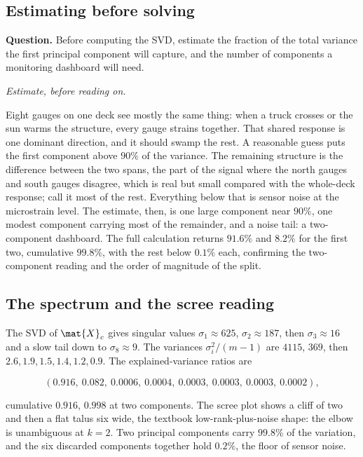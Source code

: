 \subsection{Estimating before solving}

\begin{estimation}
\textbf{Question.} Before computing the SVD, estimate the fraction of
the total variance the first principal component will capture, and the
number of components a monitoring dashboard will need.

\smallskip
\textit{Estimate, before reading on.}

\smallskip
Eight gauges on one deck see mostly the same thing: when a truck crosses
or the sun warms the structure, every gauge strains together. That
shared response is one dominant direction, and it should swamp the
rest. A reasonable guess puts the first component above $90\%$ of the
variance. The remaining structure is the difference between the two
spans, the part of the signal where the north gauges and south gauges
disagree, which is real but small compared with the whole-deck response;
call it most of the rest. Everything below that is sensor noise at the
microstrain level. The estimate, then, is one large component near
$90\%$, one modest component carrying most of the remainder, and a noise
tail: a two-component dashboard. The full calculation returns $91.6\%$
and $8.2\%$ for the first two, cumulative $99.8\%$, with the rest below
$0.1\%$ each, confirming the two-component reading and the order of
magnitude of the split.
\end{estimation}

\subsection{The spectrum and the scree reading}

The SVD of $\mat{X}_{c}$ gives singular values $\sigma_{1} \approx 625$,
$\sigma_{2} \approx 187$, then $\sigma_{3} \approx 16$ and a slow tail
down to $\sigma_{8} \approx 9$. The variances $\sigma_{i}^{2}/(m-1)$ are
$4115$, $369$, then $2.6, 1.9, 1.5, 1.4, 1.2, 0.9$. The explained-variance
ratios are

\[
(0.916,\ 0.082,\ 0.0006,\ 0.0004,\ 0.0003,\ 0.0003,\ 0.0003,\ 0.0002),
\]

cumulative $0.916$, $0.998$ at two components. The scree plot shows a
cliff of two and then a flat talus six wide, the textbook
low-rank-plus-noise shape: the elbow is unambiguous at $k = 2$. Two
principal components carry $99.8\%$ of the variation, and the six
discarded components together hold $0.2\%$, the floor of sensor noise.

